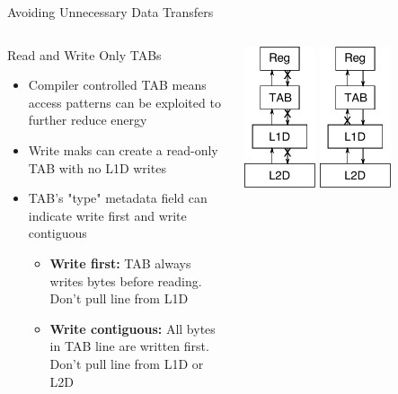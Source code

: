 \documentclass{beamer}
\begin{document}
\begin{frame}{Avoiding Unnecessary Data Transfers}
   \begin{columns}
      \begin{block}{Read and Write Only TABs}
         \begin{itemize}
            \item Compiler controlled TAB means access patterns can be exploited to 
               further reduce energy
            \item Write maks can create a read-only TAB with no L1D writes
            \item TAB's "type" metadata field can indicate write first and write contiguous
               \begin{itemize}
                  \item \textbf{Write first:} TAB always writes bytes before reading.
                     Don't pull line from L1D
                  \item \textbf{Write contiguous:} All bytes in TAB line are written 
                     first. Don't pull line from L1D or L2D
               \end{itemize}
         \end{itemize}
      \end{block}
      \includegraphics[width=0.33\textwidth]{figures/memorytransfer_readonly.pdf}
      \includegraphics[width=0.33\textwidth]{figures/memorytransfer_writefirst.pdf}

\end{columns}
\end{frame}
\end{document}
